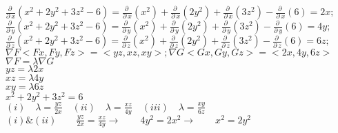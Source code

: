 \documentclass[13pt]{memoir}
\begin{document}
\begin{enumerate}
$\frac{\partial \:}{\partial \:x}\left(x^2+2y^2+3z^2-6\right) = \frac{\partial \:}{\partial \:x}\left(x^2\right)+\frac{\partial \:}{\partial \:x}\left(2y^2\right)+\frac{\partial \:}{\partial \:x}\left(3z^2\right)-\frac{\partial \:}{\partial \:x}\left(6\right) = 2x;$\\
$\frac{\partial \:}{\partial \:y}\left(x^2+2y^2+3z^2-6\right)=\frac{\partial \:}{\partial \:y}\left(x^2\right)+\frac{\partial \:}{\partial \:y}\left(2y^2\right)+\frac{\partial \:}{\partial \:y}\left(3z^2\right)-\frac{\partial \:}{\partial \:y}\left(6\right)=4y;$\\
$\frac{\partial \:}{\partial \:z}\left(x^2+2y^2+3z^2-6\right)=\frac{\partial \:}{\partial \:z}\left(x^2\right)+\frac{\partial \:}{\partial \:z}\left(2y^2\right)+\frac{\partial \:}{\partial \:z}\left(3z^2\right)-\frac{\partial \:}{\partial \:z}\left(6\right)=6z;$\\

$\nabla F <Fx, Fy, Fz> = <yz, xz, xy>; \nabla G <Gx, Gy, Gz> = <2x,4y,6z>$ \\
$\nabla F = \lambda \nabla G$\\

$yz = \lambda 2x$\\
$xz = \lambda 4y$\\
$xy = \lambda 6z$\\
$x^2 +2y^2 + 3z^2 = 6$\\

$\left(i\right)\quad\lambda = \frac{yz}{2x} \quad (ii)\quad\lambda = \frac{xz}{4y} \quad(iii)\quad\lambda = \frac{xy}{6z}$\\

$\left(i\right) \& \left(ii\right)\qquad \frac{yz}{2x} = \frac{xz}{4y} \rightarrow\qquad 4y^2 = 2x^2  \rightarrow\qquad x^2 = 2y^2$\\


\end{enumerate}
\end{document}
